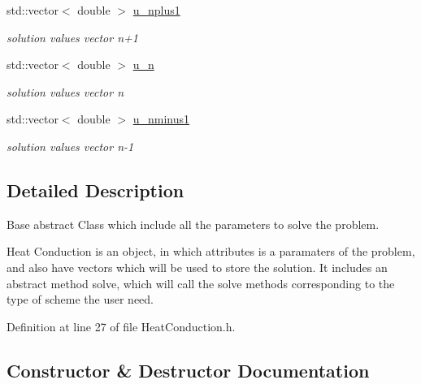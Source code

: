 \begin{DoxyCompactItemize}
\mbox{\label{class_heat_conduction_a6ad0488a3d4e3c9190b2abb3de8ccd2e}} 
std\+::vector$<$ double $>$ \hyperlink{class_heat_conduction_a6ad0488a3d4e3c9190b2abb3de8ccd2e}{u\+\_\+nplus1}
\begin{DoxyCompactList}\small\item\em solution values vector n+1 \end{DoxyCompactList}\item 
\mbox{\label{class_heat_conduction_ac2e557e6d0c482dd49f78369c8d9f708}} 
std\+::vector$<$ double $>$ \hyperlink{class_heat_conduction_ac2e557e6d0c482dd49f78369c8d9f708}{u\+\_\+n}
\begin{DoxyCompactList}\small\item\em solution values vector n \end{DoxyCompactList}\item 
\mbox{\label{class_heat_conduction_ae5bf8bf1144632fad72a415023ca4461}} 
std\+::vector$<$ double $>$ \hyperlink{class_heat_conduction_ae5bf8bf1144632fad72a415023ca4461}{u\+\_\+nminus1}
\begin{DoxyCompactList}\small\item\em solution values vector n-\/1 \end{DoxyCompactList}\end{DoxyCompactItemize}


\subsection{Detailed Description}
Base abstract Class which include all the parameters to solve the problem. 

Heat Conduction is an object, in which attributes is a paramaters of the problem, and also have vectors which will be used to store the solution. It includes an abstract method solve, which will call the solve methods corresponding to the type of scheme the user need. 

Definition at line 27 of file Heat\+Conduction.\+h.



\subsection{Constructor \& Destructor Documentation}
\mbox{\label{class_heat_conduction_ab81631c27726b7048e49ac0b8fba9b23}} 
